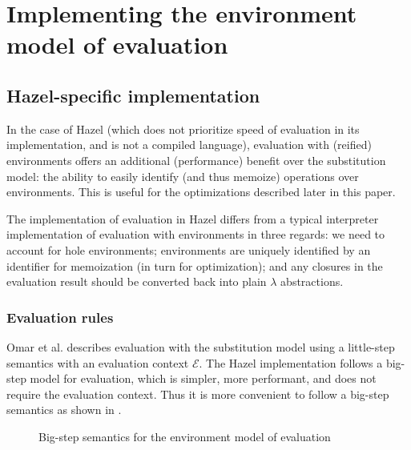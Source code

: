 \chapter{Implementing the environment model of evaluation}
\label{sec:env_model_evaluation}

\section{Hazel-specific implementation}
\label{sec:eval_with_envs}

In the case of Hazel (which does not prioritize speed of evaluation in its implementation, and is not a compiled language), evaluation with (reified) environments offers an additional (performance) benefit over the substitution model: the ability to easily identify (and thus memoize) operations over environments. This is useful for the optimizations described later in this paper.

The implementation of evaluation in Hazel differs from a typical interpreter implementation of evaluation with environments in three regards: we need to account for hole environments; environments are uniquely identified by an identifier for memoization (in turn for optimization); and any closures in the evaluation result should be converted back into plain $\lambda$ abstractions.

\subsection{Evaluation rules}
\label{sec:evalenv-rules}


Omar et al. \cite{conf/popl/HazelnutLive19} describes evaluation with the substitution model using a little-step semantics with an evaluation context $\mathcal{E}$. The Hazel implementation follows a big-step model for evaluation, which is simpler, more performant, and does not require the evaluation context. Thus it is more convenient to follow a big-step semantics as shown in .

\begin{figure}
  \centering
  \begin{mdframed}
    \begin{singlespace}
      
    \end{singlespace}
  \end{mdframed}
  \caption{Big-step semantics for the environment model of evaluation}
  \label{fig:big-step-formal}
\end{figure}

